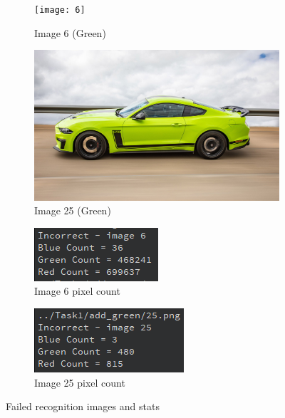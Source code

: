 \documentclass[conference]{IEEEtran}
\begin{document}
\begin{figure}[h!]
\centering
\begin{subfigure}{0.225\textwidth}
    \texttt{[image: 6]}
    \caption{Image 6 (Green)}
    \label{fig:first}
\end{subfigure}
\hfill
\begin{subfigure}{0.225\textwidth}
    \includegraphics[width=\textwidth]{25}
    \caption{Image 25 (Green)}
    \label{fig:second}
\end{subfigure}

\begin{subfigure}{0.225\textwidth}
    \includegraphics[width=\textwidth]{6_stats}
    \caption{Image 6 pixel count}
    \label{fig:third}
\end{subfigure}
\hfill
\begin{subfigure}{0.225\textwidth}
    \includegraphics[width=\textwidth]{25_stats}
    \caption{Image 25 pixel count}
    \label{fig:fourth}
\end{subfigure}

\caption{Failed recognition images and stats}
\label{fig:fails}
\end{figure}
\end{document}
